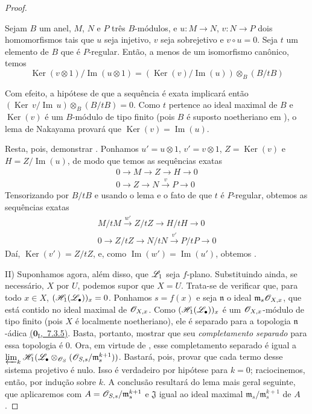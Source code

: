 \begin{proof}
\begin{lemma}[12.3.3.3]
\label{IV.12.3.3.3}
Sejam $B$ um anel, $M$, $N$ e $P$ três $B$-módulos, e
$u:M\to N$, $v:N\to P$ dois homomorfismos tais que $u$
seja injetivo, $v$ seja sobrejetivo e $v\circ u=0$.
Seja $t$ um elemento de $B$ que é $P$-regular.
Então, a menos de um isomorfismo canônico, temos
\begin{equation}
\tag{12.3.3.4}
\label{IV.12.3.3.4}
\operatorname{Ker}(v\otimes1)/\operatorname{Im}(u\otimes1)
=(\operatorname{Ker}(v)/\operatorname{Im}(u))\otimes_B(B/tB)
\end{equation}
\end{lemma}

Com efeito, a hipótese de que a sequência
 é exata implicará então
$(\operatorname{Ker}\,v/\operatorname{Im}\,u)\otimes_B(B/tB)=0$.
Como $t$ pertence ao ideal maximal de $B$ e
$\operatorname{Ker}(v)$ é um $B$-módulo de tipo finito
(pois $B$ é suposto noetheriano em ),
o lema de Nakayama provará que
$\operatorname{Ker}(v)=\operatorname{Im}(u)$.

Resta, pois, demonstrar .
Ponhamos $u'=u\otimes1$, $v'=v\otimes1$,
$Z=\operatorname{Ker}(v)$ e $H=Z/\operatorname{Im}(u)$,
de modo que temos as sequências exatas
\begin{gather*}
0\to M\to Z\to H\to0\\
0\to Z\to N\xrightarrow{v}P\to0
\end{gather*}
Tensorizando por $B/tB$ e usando o lema
 e o fato de que $t$ é $P$-regular,
obtemos as sequências exatas
\begin{gather*}
M/tM\xrightarrow{w'}Z/tZ\to H/tH\to0\\
0\to Z/tZ\to N/tN\xrightarrow{v'}P/tP\to0
\end{gather*}
Daí, $\operatorname{Ker}(v')=Z/tZ$, e, como
$\operatorname{Im}(w')=\operatorname{Im}(u')$,
obtemos .

\medskip
II) Suponhamos agora, além disso, que $\mathscr{L}_1$ seja
$f$-plano. Substituindo ainda, se necessário, $X$ por
$U$, podemos supor que $X=U$.
Trata-se de verificar que, para todo $x\in X$,
$(\mathscr{H}_1(\mathscr{L}_\bullet))_x=0$.
Ponhamos $s=f(x)$ e seja $\mathfrak{n}$ o ideal
$\mathfrak{m}_s\mathscr{O}_{X,x}$, que está contido no ideal
maximal de $\mathscr{O}_{X,x}$.
Como $(\mathscr{H}_1(\mathscr{L}_\bullet))_x$ é um
$\mathscr{O}_{X,x}$-módulo de tipo finito
(pois $X$ é localmente noetheriano), ele é separado
para a topologia $\mathfrak{n}$-ádica
\hyperref[0.7.3.5]{($\mathbf{0}_{\mathrm{I}}$,~7.3.5)}.
Basta, portanto, mostrar que seu \emph{completamento separado}
para essa topologia é $0$.
Ora, em virtude de , esse
completamento separado é igual a
$\varprojlim_k\mathscr{H}_1(\mathscr{L}_\bullet\otimes_{\mathscr{O}_S}(\mathscr{O}_{S,s}/\mathfrak{m}_s^{k+1}))$.
Bastará, pois, provar que cada termo desse sistema
projetivo é nulo.
Isso é verdadeiro por hipótese para $k=0$;
raciocinemos, então, por indução sobre $k$.
A conclusão resultará do lema mais geral seguinte,
que aplicaremos com $A=\mathscr{O}_{S,s}/\mathfrak{m}_s^{k+1}$
e $\mathfrak{J}$ igual ao ideal maximal
$\mathfrak{m}_s/\mathfrak{m}_s^{k+1}$ de $A$.


\end{proof}
